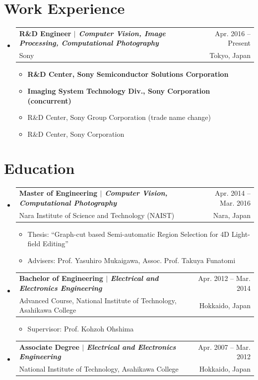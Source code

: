 \documentclass[a4paper,11pt]{article}
\makeatletter
\newcommand{\CVItem}[1]{
  \item\small{
    {#1 \vspace{-2pt}}
  }
}
\newcommand{\CVSubheading}[4]{
  \vspace{-2pt}\item
    \begin{tabular*}{0.97\textwidth}[t]{l@{\extracolsep{\fill}}r}
      \textbf{#1} & #2 \\
      \small#3 & \small #4 \\
    \end{tabular*}\vspace{-7pt}
}
\newcommand{\CVSubHeadingListStart}{\begin{itemize}[leftmargin=0.5cm, label={}]}
\newcommand{\CVSubHeadingListEnd}{\end{itemize}}
\newcommand{\CVItemListStart}{\begin{itemize}}
\newcommand{\CVItemListEnd}{\end{itemize}\vspace{-5pt}}
\makeatother
\begin{document}
\section{Work Experience}
  \CVSubHeadingListStart
    \CVSubheading
      {R\&D Engineer \textnormal{\emph{$|$ Computer Vision, Image Processing, Computational Photography}}}{Apr. 2016 -- Present}
      {Sony}{Tokyo, Japan}
      \CVItemListStart
        \CVItem{\textbf{ R\&D Center, Sony Semiconductor Solutions Corporation}}
        \CVItem{\textbf{ Imaging System Technology Div., Sony Corporation (concurrent)}}
        \CVItem{ R\&D Center, Sony Group Corporation (trade name change)}
        \CVItem{ R\&D Center, Sony Corporation}
      \CVItemListEnd
  \CVSubHeadingListEnd

\section{Education}
  \CVSubHeadingListStart
    \CVSubheading
      {Master of Engineering \textnormal{\emph{$|$ Computer Vision, Computational Photography}}}{Apr. 2014 -- Mar. 2016}
      {Nara Institute of Science and Technology (NAIST)}{Nara, Japan}
      \CVItemListStart
        \CVItem{Thesis: ``Graph-cut based Semi-automatic Region Selection for 4D Light-field Editing''}
        \CVItem{Advisers: Prof. Yasuhiro Mukaigawa, Assoc. Prof. Takuya Funatomi}
      \CVItemListEnd
    \CVSubheading
      {Bachelor of Engineering \textnormal{\emph{$|$ Electrical and Electronics Engineering}}}{Apr. 2012 -- Mar. 2014}
      {Advanced Course, National Institute of Technology, Asahikawa College}{Hokkaido, Japan}
      \CVItemListStart
        \CVItem{Supervisor: Prof. Kohzoh Ohshima}
      \CVItemListEnd
    \CVSubheading
      {Associate Degree \textnormal{\emph{$|$ Electrical and Electronics Engineering}}}{Apr. 2007 -- Mar. 2012}
      {National Institute of Technology, Asahikawa College}{Hokkaido, Japan}
  \CVSubHeadingListEnd

\end{document}
